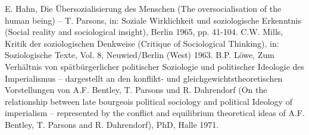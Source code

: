 \begin{thebibliography}{xxx}
 E. Hahn, Die Übersozialisierung des Menschen (The
  oversocialisation of the human being) -- T. Parsons, in: Soziale
  Wirklichkeit und soziologische Erkenntnis (Social reality and sociological
  insight), Berlin 1965, pp. 41-104.
 C.W. Mills, Kritik der soziologischen Denkweise (Critique
  of Sociological Thinking), in: Soziologische Texte, Vol. 8, Neuwied/Berlin
  (West) 1963.
 B.P. Löwe, Zum Verhältnis von spätbürgerlicher politischer
  Soziologie und politischer Ideologie des Imperialismus -- dargestellt an den
  konflikt- und gleichgewichtstheoretischen Vorstellungen von A.F. Bentley,
  T. Parsons und R. Dahrendorf (On the relationship between late bourgeois
  political sociology and political Ideology of imperialism -- represented by
  the conflict and equilibrium theoretical ideas of A.F. Bentley, T. Parsons
  and R. Dahrendorf), PhD, Halle 1971.
\end{thebibliography}
